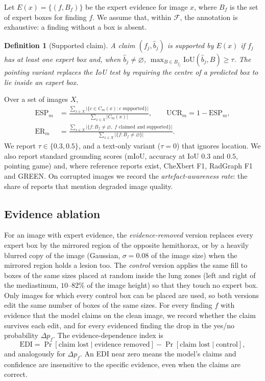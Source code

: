 \documentclass[pdflatex,sn-mathphys-num]{sn-jnl}
\newcommand{\ESP}{\mathrm{ESP}}
\newcommand{\UCR}{\mathrm{UCR}}
\newcommand{\ER}{\mathrm{ER}}
\newcommand{\IoU}{\mathrm{IoU}}
\theoremstyle{thmstyleone}
\newtheorem{definition}{Definition}
\begin{document}
Let $E(x)=\{(f, B_f)\}$ be the expert evidence for image $x$, where $B_f$ is the set of expert boxes for finding $f$. We assume that, within $\mathcal{F}$, the annotation is exhaustive: a finding without a box is absent.

\begin{definition}[Supported claim]
A claim $(f_j,\hat b_j)$ is supported by $E(x)$ if $f_j$ has at least one expert box and, when $\hat b_j\neq\varnothing$, $\max_{B\in B_{f_j}} \IoU(\hat b_j, B)\ge\tau$. The pointing variant replaces the IoU test by requiring the centre of a predicted box to lie inside an expert box.
\end{definition}

Over a set of images $X$,
\begin{align}
\ESP_m &= \frac{\sum_{x\in X} \big|\{c\in C_m(x): c \text{ supported}\}\big|}{\sum_{x\in X} |C_m(x)|}, \qquad \UCR_m = 1-\ESP_m, \\
\ER_m &= \frac{\sum_{x\in X} \big|\{f: B_f\neq\varnothing,\; f \text{ claimed and supported}\}\big|}{\sum_{x\in X} \big|\{f: B_f\neq\varnothing\}\big|}.
\end{align}
We report $\tau\in\{0.3, 0.5\}$, and a text-only variant ($\tau=0$) that ignores location. We also report standard grounding scores (mIoU, accuracy at IoU $0.3$ and $0.5$, pointing game) and, where reference reports exist, CheXbert F1, RadGraph F1 and GREEN. On corrupted images we record the \emph{artefact-awareness rate}: the share of reports that mention degraded image quality.

\subsection{Evidence ablation}\label{sec:ablation}

For an image with expert evidence, the \emph{evidence-removed} version replaces every expert box by the mirrored region of the opposite hemithorax, or by a heavily blurred copy of the image (Gaussian, $\sigma = 0.08$ of the image size) when the mirrored region holds a lesion too. The \emph{control} version applies the same fill to boxes of the same sizes placed at random inside the lung zones (left and right of the mediastinum, $10$--$82\%$ of the image height) so that they touch no expert box. Only images for which every control box can be placed are used, so both versions edit the same number of boxes of the same sizes. For every finding $f$ with evidence that the model claims on the clean image, we record whether the claim survives each edit, and for every evidenced finding the drop in the yes/no probability $\Delta p_f$. The evidence-dependence index is
\begin{equation}
\mathrm{EDI} = \Pr[\text{claim lost} \mid \text{evidence removed}] - \Pr[\text{claim lost} \mid \text{control}],
\end{equation}
and analogously for $\Delta p_f$. An EDI near zero means the model's claims and confidence are insensitive to the specific evidence, even when the claims are correct.
\end{document}

